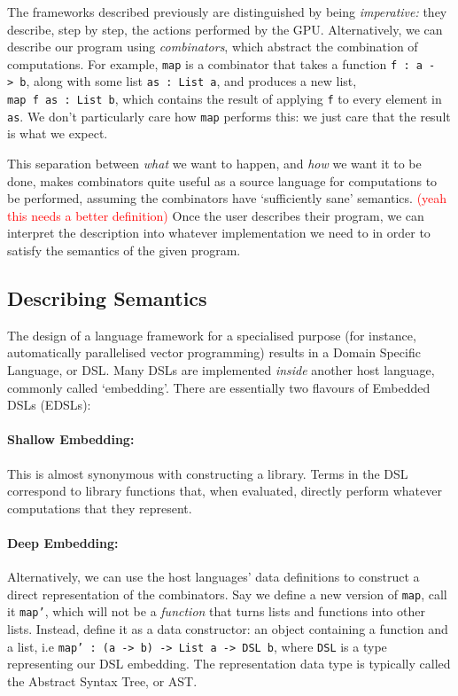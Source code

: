 \documentclass[a4paper,12pt]{article}
\newcommand{\red}[1]{\textcolor{red}{#1}}
\newcommand{\icf}[1]{\mbox{\texttt{#1}}}
\begin{document}
The frameworks described previously are distinguished by being \textit{imperative:} they describe, step by step, the actions performed by the GPU.
Alternatively, we can describe our program using \textit{combinators}, which abstract the combination of computations. 
For example, \icf{map} is a combinator that takes a function \icf{f\ :\  a\ ->\ b}, along with some list \icf{as\ :\ List\ a}, and produces a new list, \icf{map\ f\ as\ :\ List\ b}, which contains the result of applying \icf{f} to every element in \icf{as}. 
We don't particularly care how \icf{map} performs this: we just care that the result is what we expect.

This separation between \textit{what} we want to happen, and \textit{how} we want it to be done, makes combinators quite useful as a source language for computations to be performed, assuming the combinators have `sufficiently sane' semantics. 
\red{(yeah this needs a better definition)} 
Once the user describes their program, we can interpret the description into whatever implementation we need to in order to satisfy the semantics of the given program.

\subsection{Describing Semantics}

The design of a language framework for a specialised purpose (for instance, automatically parallelised vector programming) results in a Domain Specific Language, or DSL. 
Many DSLs are implemented \textit{inside} another host language, commonly called `embedding'. There are essentially two flavours of Embedded DSLs (EDSLs):

\paragraph*{Shallow Embedding:} 
This is almost synonymous with constructing a library. 
Terms in the DSL correspond to library functions that, when evaluated, directly perform whatever computations that they represent.

\paragraph*{Deep Embedding:} 
Alternatively, we can use the host languages' data definitions to construct a direct representation of the combinators. 
Say we define a new version of \icf{map}, call it \icf{map'}, which will not be a \textit{function} that turns lists and functions into other lists.
Instead, define it as a data constructor: an object containing a function and a list, i.e \texttt{map'\ :\ (a\ ->\ b)\ ->\ List\ a\ ->\ DSL\ b}, where \icf{DSL} is a type representing our DSL embedding. The representation data type is typically called the Abstract Syntax Tree, or AST.
\end{document}
